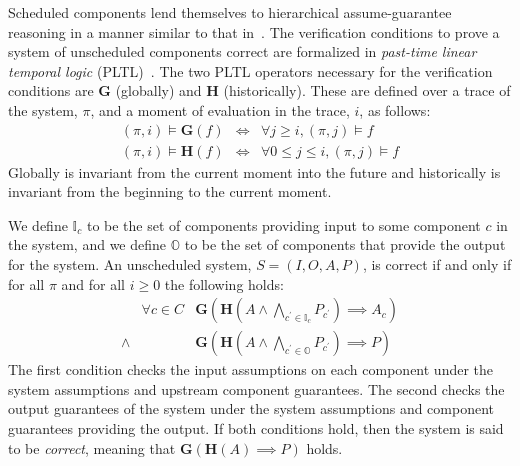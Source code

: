 
\newcommand{\globally}{\ensuremath{\mathbf{G}}}
\newcommand{\historically}{\ensuremath{\mathbf{H}}}
\newcommand{\assumes}{\ensuremath{A}}
\newcommand{\guarantees}{\ensuremath{P}}
\newcommand{\dispatch}{\ensuremath{\mathit{dispatch}}}
\newcommand{\complete}{\ensuremath{\mathit{complete}}}
\newcommand{\same}[1]{\ensuremath{\mathit{same}(#1)}}
\newcommand{\inputs}{\ensuremath{I}}
\newcommand{\outputs}{\ensuremath{O}}
\newcommand{\system}{\ensuremath{S}}
\newcommand{\components}{\ensuremath{C}}
\newcommand{\schedule}{\ensuremath{\phi}}
\newcommand{\valid}{\ensuremath{\mathit{valid}}}
\newcommand{\dpred}{\ensuremath{\delta^\phi}}
\newcommand{\dispred}{\ensuremath{\mathbb{D}^\phi}}
\newcommand{\compred}{\ensuremath{\mathbb{C}^\phi}}
\newcommand{\dispredp}{\ensuremath{\mathbb{D}^{\phi\prime}}}
\newcommand{\compredp}{\ensuremath{\mathbb{C}^{\phi\prime}}}


Scheduled components lend themselves to hierarchical assume-guarantee reasoning in a manner similar to that in~\cite{AGREE2}.
The verification conditions to prove a system of unscheduled components correct are formalized in \emph{past-time linear temporal logic} (PLTL)~\cite{PLTL}. 
The two PLTL operators necessary for the verification conditions are $\globally$ (globally) and $\historically$ (historically).
These are defined over a trace of the system, $\pi$, and a moment of evaluation in the trace, $i$, as follows:
\begin{eqnarray*}
 (\pi, i) \models \globally(f) & \iff & \forall j \ge i, (\pi, j) \models f \\
(\pi, i) \models \historically(f) & \iff & \forall 0 \le j \le i, (\pi, j) \models f
\end{eqnarray*}
Globally is invariant from the current moment into the future and historically is invariant from the beginning to the current moment.

We define $\mathbb{I}_c$ to be the set of components providing input to some component $c$ in the system, and we define $\mathbb{O}$ to be the set of components that provide the output for the system. An unscheduled system, $\system = (\inputs, \outputs, \assumes, \guarantees)$, is correct if and only if for all $\pi$ and for all $i \ge 0$ the following holds:
\[
\begin{array}{lll}
        & \forall c \in \components &  
            \globally(\historically(\assumes \wedge 
            \bigwedge_{c^\prime \in \mathbb{I}_c} P_{c^\prime}) 
            \implies \assumes_c) \\
 \wedge &   & 
            \globally(\historically(\assumes \wedge 
            \bigwedge_{c^\prime \in \mathbb{O}} \guarantees_{c^\prime}) 
            \implies \guarantees)
\end{array}
\]
The first condition checks the input assumptions on each component under the system assumptions and upstream component guarantees. The second checks the output guarantees of the system under the system assumptions and component guarantees providing the output.  If both conditions hold, then the system is said to be \emph{correct}, meaning that $\globally(\historically(\assumes) \implies \guarantees)$ holds.

